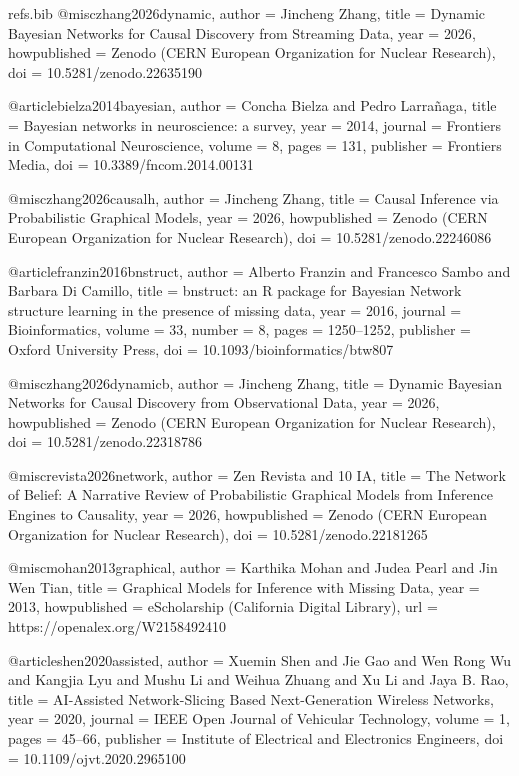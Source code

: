 \begin{filecontents*}[overwrite]{refs.bib}
@misc{zhang2026dynamic,
  author = {Jincheng Zhang},
  title = {{Dynamic Bayesian Networks for Causal Discovery from Streaming Data}},
  year = {2026},
  howpublished = {Zenodo (CERN European Organization for Nuclear Research)},
  doi = {10.5281/zenodo.22635190}
}

@article{bielza2014bayesian,
  author = {Concha Bielza and Pedro Larra{\~n}aga},
  title = {{Bayesian networks in neuroscience: a survey}},
  year = {2014},
  journal = {Frontiers in Computational Neuroscience},
  volume = {8},
  pages = {131},
  publisher = {Frontiers Media},
  doi = {10.3389/fncom.2014.00131}
}

@misc{zhang2026causalh,
  author = {Jincheng Zhang},
  title = {{Causal Inference via Probabilistic Graphical Models}},
  year = {2026},
  howpublished = {Zenodo (CERN European Organization for Nuclear Research)},
  doi = {10.5281/zenodo.22246086}
}

@article{franzin2016bnstruct,
  author = {Alberto Franzin and Francesco Sambo and Barbara Di Camillo},
  title = {{bnstruct: an R package for Bayesian Network structure learning in the presence of missing data}},
  year = {2016},
  journal = {Bioinformatics},
  volume = {33},
  number = {8},
  pages = {1250--1252},
  publisher = {Oxford University Press},
  doi = {10.1093/bioinformatics/btw807}
}

@misc{zhang2026dynamicb,
  author = {Jincheng Zhang},
  title = {{Dynamic Bayesian Networks for Causal Discovery from Observational Data}},
  year = {2026},
  howpublished = {Zenodo (CERN European Organization for Nuclear Research)},
  doi = {10.5281/zenodo.22318786}
}

@misc{revista2026network,
  author = {Zen Revista and 10 IA},
  title = {{The Network of Belief: A Narrative Review of Probabilistic Graphical Models from Inference Engines to Causality}},
  year = {2026},
  howpublished = {Zenodo (CERN European Organization for Nuclear Research)},
  doi = {10.5281/zenodo.22181265}
}

@misc{mohan2013graphical,
  author = {Karthika Mohan and Judea Pearl and Jin Wen Tian},
  title = {{Graphical Models for Inference with Missing Data}},
  year = {2013},
  howpublished = {eScholarship (California Digital Library)},
  url = {https://openalex.org/W2158492410}
}

@article{shen2020assisted,
  author = {Xuemin Shen and Jie Gao and Wen Rong Wu and Kangjia Lyu and Mushu Li and Weihua Zhuang and Xu Li and Jaya B. Rao},
  title = {{AI-Assisted Network-Slicing Based Next-Generation Wireless Networks}},
  year = {2020},
  journal = {IEEE Open Journal of Vehicular Technology},
  volume = {1},
  pages = {45--66},
  publisher = {Institute of Electrical and Electronics Engineers},
  doi = {10.1109/ojvt.2020.2965100}
}


\end{filecontents*}
